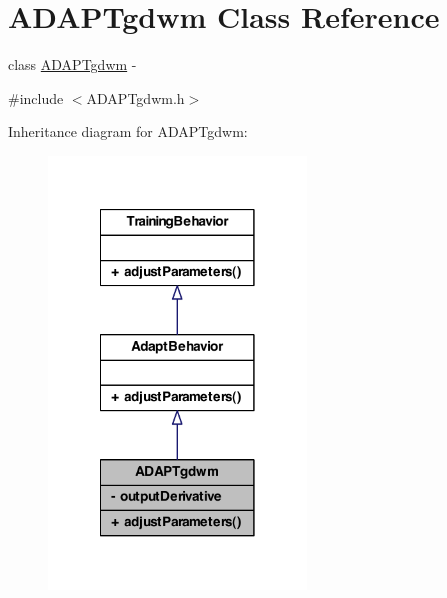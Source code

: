 \hypertarget{class_a_d_a_p_tgdwm}{
\section{ADAPTgdwm Class Reference}
\label{class_a_d_a_p_tgdwm}
}


class \hyperlink{class_a_d_a_p_tgdwm}{ADAPTgdwm} -\/  




{\ttfamily \#include $<$ADAPTgdwm.h$>$}



Inheritance diagram for ADAPTgdwm:
\nopagebreak
\begin{figure}[H]
\begin{center}
\leavevmode
\includegraphics[width=194pt]{class_a_d_a_p_tgdwm__inherit__graph}
\end{center}
\end{figure}


